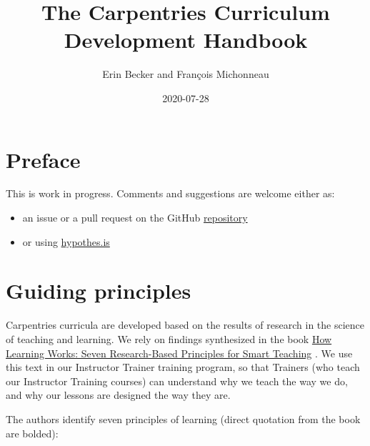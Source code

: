 \documentclass[]{book}
\title{The Carpentries Curriculum Development Handbook}
\author{Erin Becker and François Michonneau}
\date{2020-07-28}
\providecommand{\tightlist}{%
  \setlength{\itemsep}{0pt}\setlength{\parskip}{0pt}}
\begin{document}
\maketitle

{
\setcounter{tocdepth}{1}
\tableofcontents
}
\hypertarget{preface}{%
\chapter*{Preface}\label{preface}}

This is work in progress. Comments and suggestions are welcome either as:

\begin{itemize}
\tightlist
\item
  an issue or a pull request on the GitHub \href{https://github.com/carpentries/curriculum-development}{repository}
\item
  or using \href{https://web.hypothes.is/start/}{hypothes.is}
\end{itemize}

\hypertarget{guiding-principles}{%
\chapter{Guiding principles}\label{guiding-principles}}

Carpentries curricula are developed based on the results of research in the science of
teaching and learning. We rely on findings synthesized in the book
\href{https://www.wiley.com/en-us/How+Learning+Works\%3A+Seven+Research+Based+Principles+for+Smart+Teaching-p-9780470484104}{How Learning Works: Seven Research-Based Principles for Smart Teaching} \citep{ambrose2010learning}. We use this text in our Instructor Trainer training program, so that
Trainers (who teach our Instructor Training courses) can understand why we teach the way we
do, and why our lessons are designed the way they are.

The authors identify seven principles of learning (direct quotation from the book are bolded):
\end{document}
